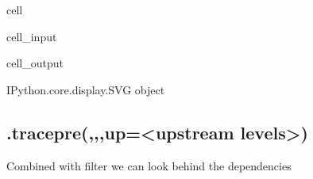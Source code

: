 \documentclass[letterpaper,10pt,english]{jupyterBook}
\begin{document}
\begin{sphinxuseclass}{cell}\begin{sphinxVerbatimInput}

\begin{sphinxuseclass}{cell_input}
\begin{sphinxVerbatim}[commandchars=\\\{\}]
\end{sphinxVerbatim}

\end{sphinxuseclass}\end{sphinxVerbatimInput}
\begin{sphinxVerbatimOutput}

\begin{sphinxuseclass}{cell_output}
\begin{sphinxVerbatim}[commandchars=\\\{\}]
\PYGZlt{}IPython.core.display.SVG object\PYGZgt{}
\end{sphinxVerbatim}

\end{sphinxuseclass}\end{sphinxVerbatimOutput}

\end{sphinxuseclass}

\subsection{.tracepre(,,,up=<upstream levels>)}
\label{\detokenize{content/howto/structure/Logical_structure:tracepre-up-upstream-levels}}
\sphinxAtStartPar
Combined with filter we can look behind the dependencies
\end{document}
